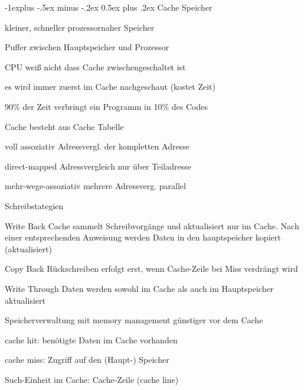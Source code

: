 \documentclass[10pt,landscape]{article}
\makeatletter
\renewcommand{\subsection}{\@startsection{subsection}{2}{0mm}%
                                {-1explus -.5ex minus -.2ex}%
                                {0.5ex plus .2ex}%
                                {\normalfont\normalsize\bfseries}}
\makeatother
\begin{document}
\begin{multicols}{3}
  \subsection{Cache Speicher}
  \begin{itemize*}
    \item kleiner, schneller prozessornaher Speicher
    \item Puffer zwischen Hauptspeicher und Prozessor
    \item CPU weiß nicht dass Cache zwischengeschaltet ist
    \item es wird immer zuerst im Cache nachgeschaut (kostet Zeit)
    \item 90\% der Zeit verbringt ein Programm in 10\% des Codes
    \item Cache besteht aus Cache Tabelle
    \begin{description*}
      \item[voll assoziativ] Adressvergl. der kompletten Adresse
      \item[direct-mapped] Adressvergleich nur über Teiladresse
      \item[mehr-wege-assoziativ] mehrere Adressverg. parallel
    \end{description*}
    \item Schreibstategien
    \begin{description*}
      \item[Write Back] Cache sammelt Schreibvorgänge und aktualisiert nur im Cache. Nach einer entsprechenden Anweisung werden Daten in den hauptspeicher kopiert (aktualisiert)
      \item[Copy Back] Rückschreiben erfolgt erst, wenn Cache-Zeile bei Miss verdrängt wird
      \item[Write Through] Daten werden sowohl im Cache als auch im Hauptspeicher aktualisiert
    \end{description*}
    \item Speicherverwaltung mit memory management günstiger vor dem Cache
    \item cache hit: benötigte Daten im Cache vorhanden
    \item cache miss: Zugriff auf den (Haupt-) Speicher
    \item Such-Einheit im Cache: Cache-Zeile (cache line)

\end{itemize*}
\end{multicols}
\end{document}
